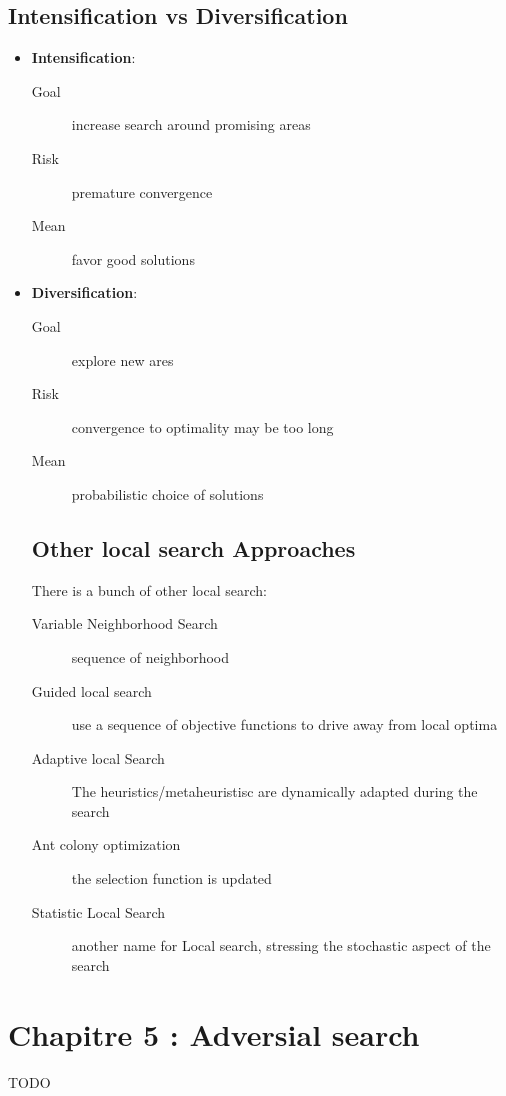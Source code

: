 \subsection{Intensification vs Diversification}

\begin{itemize}
\item \textbf{Intensification}:

	\begin{description}
		\item[Goal] increase search around promising areas
		\item[Risk] premature convergence
		\item[Mean] favor good solutions
	\end{description}

\item \textbf{Diversification}:
	 
	\begin{description}
		\item[Goal] explore new ares
		\item[Risk] convergence to optimality may be too long
		\item[Mean] probabilistic choice of solutions
	\end{description}

\subsection{Other local search Approaches}

There is a bunch of other local search:
\begin{description}
\item[Variable Neighborhood Search] sequence of neighborhood
\item[Guided local search] use a sequence of objective functions to drive away from local optima
\item[Adaptive local Search] The heuristics/metaheuristisc are dynamically adapted during the search
\item[Ant colony optimization] the selection function is updated
\item[Statistic Local Search] another name for Local search, stressing the stochastic aspect of the search
\end{description}

\end{itemize}


\section{Chapitre 5 : Adversial search}
TODO

